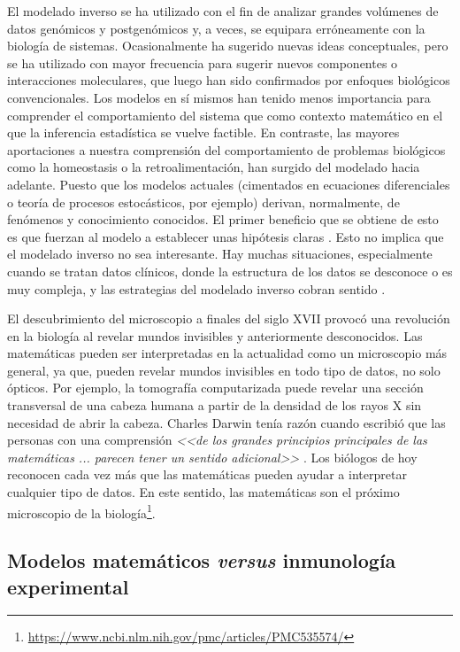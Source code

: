El modelado inverso se ha utilizado con el fin de analizar grandes volúmenes de datos genómicos y postgenómicos y, a veces, se equipara erróneamente con la biología de sistemas. Ocasionalmente ha sugerido nuevas ideas conceptuales, pero se ha utilizado con mayor frecuencia para sugerir nuevos componentes o interacciones moleculares, que luego han sido confirmados por enfoques biológicos convencionales. Los modelos en sí mismos han tenido menos importancia para comprender el comportamiento del sistema que como contexto matemático en el que la inferencia estadística se vuelve factible. En contraste, las mayores aportaciones a nuestra comprensión del comportamiento de problemas biológicos como la homeostasis o la retroalimentación, han surgido del modelado hacia adelante. Puesto que los modelos actuales (cimentados en ecuaciones diferenciales o teoría de procesos estocásticos, por ejemplo) derivan, normalmente, de fenómenos y conocimiento conocidos. El primer beneficio que se obtiene de esto es que fuerzan al modelo a establecer unas hipótesis claras \citep{mathsModInmu}. Esto no implica que el modelado inverso no sea interesante. Hay muchas situaciones, especialmente cuando se tratan datos clínicos, donde la estructura de los datos se desconoce o es muy compleja, y las estrategias del modelado inverso cobran sentido \citep{Gunawardena2014}. 

El descubrimiento del microscopio a finales del siglo XVII provocó una revolución en la biología al revelar mundos invisibles y anteriormente desconocidos. Las matemáticas pueden ser interpretadas en la actualidad como un microscopio más general, ya que, pueden revelar mundos invisibles en todo tipo de datos, no solo ópticos. Por ejemplo, la tomografía computarizada puede revelar una sección transversal de una cabeza humana a partir de la densidad de los rayos X sin necesidad de abrir la cabeza. Charles Darwin tenía razón cuando escribió que las personas con una comprensión \textit{<<de los grandes principios principales de las matemáticas ... parecen tener un sentido adicional>>} \citep{darwin1887life}. Los biólogos de hoy reconocen cada vez más que las matemáticas pueden ayudar a interpretar cualquier tipo de datos. En este sentido, las matemáticas son el próximo microscopio de la biología\footnote{\url{https://www.ncbi.nlm.nih.gov/pmc/articles/PMC535574/}}.

\subsection{Modelos matemáticos \textit{versus} inmunología experimental}
\label{sub:modelosvsinmuno}

